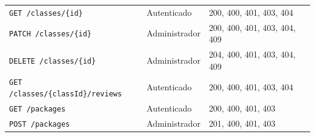 \begin{table}[!t]
\begin{tabular}{p{}p{}p{}}
\texttt{GET /\allowbreak{}classes/\allowbreak{}\{id\}} & Autenticado & 200, 400, 401, 403, 404 \\
\texttt{PATCH /\allowbreak{}classes/\allowbreak{}\{id\}} & Administrador & 200, 400, 401, 403, 404, 409 \\
\texttt{DELETE /\allowbreak{}classes/\allowbreak{}\{id\}} & Administrador & 204, 400, 401, 403, 404, 409 \\
\texttt{GET /\allowbreak{}classes/\allowbreak{}\{classId\}/\allowbreak{}reviews} & Autenticado & 200, 400, 401, 403, 404 \\
\texttt{GET /\allowbreak{}packages} & Autenticado & 200, 400, 401, 403 \\
\texttt{POST /\allowbreak{}packages} & Administrador & 201, 400, 401, 403 \\
\bottomrule\end{tabular}\end{table}
